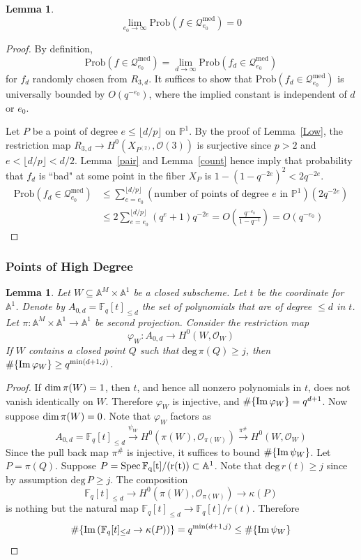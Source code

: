 \documentclass[12pt]{article}
\theoremstyle{plain}
\newtheorem{lemma}[equation]{Lemma}
\theoremstyle{definition}
\newcommand{\IA}{\mathbb{A}}
\newcommand{\IF}{\mathbb{F}}
\newcommand{\IP}{\mathbb{P}}
\newcommand{\sO}{\mathcal{O}}
\newcommand{\sQ}{\mathcal{Q}}
\renewcommand{\deg}{\mathrm{deg}\,}
\newcommand{\Spec}{\rm Spec\,}
\renewcommand\dim{{\rm dim\,}}
\newcommand{\im}{{\rm Im\,}}
\newcommand{\<}{\langle}
\renewcommand{\>}{\rangle}
\newcommand{\Prob}{\mathrm{Prob}}
\begin{document}
\begin{lemma}
\label{Medium}
$$\lim_{e_0 \to \infty} \Prob( f \in  \sQ_{e_0}^{\mathrm{med}}) = 0 $$
\end{lemma}
\begin{proof}
By definition, 
$$ \Prob( f \in  \sQ_{e_0}^{\mathrm{med}}) = \lim_{d \to \infty} \Prob(f_d \in \sQ_{e_0}^{\mathrm{med}})$$
for $f_d$ randomly chosen from $R_{3, d}$. It suffices to show that $\Prob(f_d \in \sQ_{e_0}^{\mathrm{med}})$ is universally bounded by $O(q^{-e_0})$, where the implied constant is independent of $d$ or $e_0$. 

Let $P$ be a point of degree $e \le \lfloor d/p \rfloor$ on $\IP^1$. By the proof of Lemma~\ref{Low}, the restriction map $R_{3, d} \to H^0(X_{P^{(2)}}, \sO(3))$ is surjective since $p > 2$ and $e < \lfloor d/p \rfloor < d/2$. Lemma~\ref{pair} and Lemma~\ref{count} hence imply that probability that $f_d$ is ``bad" at some point in the fiber $X_P$ is $1 - (1 - q^{-2e})^2 < 2q^{-2e}$. 
\begin{align*}
\Prob(f_d \in \sQ_{e_0}^{\mathrm{med}}) &\le \sum_{e = e_0}^{\lfloor d/p \rfloor} (\text{number of points of degree $e$ in $\IP^1$})(2q^{-2e}) \\
&\le 2 \sum_{e = e_0}^{\lfloor d/p \rfloor}(q^{e} + 1) q^{-2e} = O(\frac{q^{-e_0}}{1 - q^{-1}}) = O(q^{-e_0})
\end{align*} 
\end{proof}

\subsubsection{Points of High Degree}
\begin{lemma}
\label{highprep}
Let $W \subseteq \IA^M \times \IA^1$ be a closed subscheme. Let $t$ be the coordinate for $\IA^1$. Denote by $A_{0, d} = \IF_q[t]_{\le d}$ the set of polynomials that are of degree $\le d$ in $t$. Let $\pi : \IA^M \times \IA^1 \to \IA^1$ be second projection. Consider the restriction map 
$$ \varphi_W : A_{0, d} \to H^0(W, \sO_W) $$
If $W$ contains a closed point $Q$ such that $\deg \pi(Q) \ge j$, then $\# \{ \im \varphi_W \} \ge q^{\min(d + 1, j)}$. 
\end{lemma}
\begin{proof}
If $\dim \pi(W) = 1$, then $t$, and hence all nonzero polynomials in $t$, does not vanish identically on $W$. Therefore $\varphi_W$ is injective, and $\# \{ \im \varphi_W \} = q^{d + 1}$. 
Now suppose $\dim \pi(W) = 0$. Note that $\varphi_W$ factors as
$$ A_{0, d} = \IF_q[t]_{\le d} \stackrel{\psi_W}{\to} H^0(\pi(W), \sO_{\pi(W)}) \stackrel{\pi^\#}{\to} H^0(W, \sO_W) $$ 
Since the pull back map $\pi^\#$ is injective, it suffices to bound $\# \{\im \psi_W \}$. Let $P = \pi(Q)$. Suppose $P = \Spec \IF_q[t]/(r(t)) \subset \IA^1$. Note that $\deg r(t) \ge j$ since by assumption $\deg P \ge j$. The composition 
$$ \IF_q[t]_{\le d} \to H^0(\pi(W), \sO_{\pi(W)}) \to \kappa(P) $$
is nothing but the natural map $\IF_q[t]_{\le d} \to \IF_q[t]/r(t)$. Therefore 
$$ \#\{ \im(\IF_q[t]_{\le d} \to \kappa(P)) \} = q^{\min(d + 1, j)}  \le \# \{\im \psi_W \}$$
\end{proof}
\end{document}
